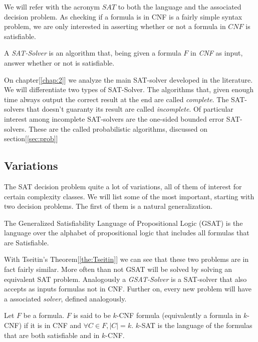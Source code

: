 We will refer with the acronym $SAT$ to both the language and the associated decision problem. As checking if a formula is in CNF is a fairly simple syntax problem, we are only interested in asserting whether or not a formula in $CNF$ is satisfiable.

\begin{definition}
  A \emph{SAT-Solver} is an algorithm that, being given a formula $F$ in \emph{CNF} as input, answer whether or not is satisfiable.
\end{definition}

On chapter[\ref{chap:2}] we analyze the main SAT-solver developed in the literature. We will differentiate two types of SAT-Solver. The algorithms that, given enough time always output the correct result at the end are called \emph{complete}. The SAT-solvers that doesn't guaranty its result are called \emph{incomplete}. Of particular interest among incomplete SAT-solvers are the one-sided bounded error SAT-solvers. These are the called probabilistic algorithms, discussed on section[\ref{sec:prob}]


\subsection{Variations}

The SAT decision problem quite a lot of variations, all of them of interest for certain complexity classes. We will list some of the most important, starting with two decision problems. The first of them is a natural generalization.

\begin{definition}
  The Generalized Satisfiability Language of Propositional Logic (GSAT) is the language over the alphabet of propositional logic that includes all formulas that are Satisfiable.
\end{definition}

With Tseitin's Theorem[\ref{the:Tseitin}] we can see that these two problems are in fact fairly similar. More often than not GSAT will be solved by solving an equivalent SAT problem. Analogously a \emph{GSAT-Solver}  is a SAT-solver that also accepts as inputs formulas not in CNF. Further on, every new problem will have a associated \emph{solver}, defined analogously.



\begin{definition}
  Let $F$ be a formula. $F$ is said to be $k$-CNF formula (equivalently a formula in $k$-CNF) if it is in CNF and $\forall C \in F, |C| = k$. $k$-SAT is the language of the formulas that are both satisfiable and in $k$-CNF.
\end{definition}


